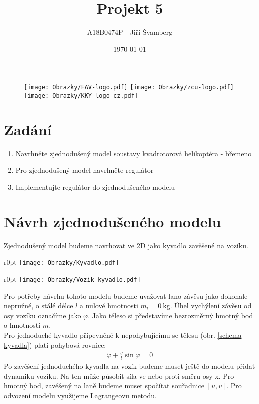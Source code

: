 \documentclass[a4paper, 12pt]{article}
\author{A18B0474P - Jiří Švamberg}
\title{Projekt 5}
\date{\today}
\begin{document}
	\begin{titlepage}
		\maketitle
		\begin{figure}
			\centering
			\texttt{[image: Obrazky/FAV-logo.pdf]}
			\texttt{[image: Obrazky/zcu-logo.pdf]}
			\texttt{[image: Obrazky/KKY\_logo\_cz.pdf]}
		\end{figure}
		\thispagestyle{empty}
		\newpage
	\end{titlepage}

	\tableofcontents
	\newpage
	\section{Zadání}
		\begin{enumerate}
			\item Navrhněte zjednodušený model soustavy kvadrotorová helikoptéra - břemeno\\
			\item Pro zjednodušený model navrhněte regulátor\\
			\item Implementujte regulátor do zjednodušeného modelu\\
		\end{enumerate}
		\clearpage
	\section{Návrh zjednodušeného modelu}
		Zjednodušený model budeme navrhovat ve 2D jako kyvadlo zavěšené na vozíku.
		\begin{wrapfigure}{r}{0pt}
			\texttt{[image: Obrazky/Kyvadlo.pdf]}
			\caption{Schéma jednoduchého kyvadla}
			\label{schema kyvadla}
		\end{wrapfigure}
		\begin{wrapfigure}{r}{0pt}
			\texttt{[image: Obrazky/Vozik-kyvadlo.pdf]}
			\caption{Schéma soustavy vozík-kyvadlo}
			\label{schema vozik-kyvadlo}
		\end{wrapfigure}
		Pro potřeby návrhu tohoto modelu budeme uvažovat lano závěsu jako dokonale nepružné, o stálé délce $l$ a nulové hmotnosti $m_l = \SI{0}{\kilogram}$. Úhel vychýlení závěsu od osy vozíku označíme jako $\varphi$. Jako těleso si představíme bezrozměrný hmotný bod o hmotnosti $m$.\\
		Pro jednoduché kyvadlo připevněné k nepohybujícímu se tělesu (obr. \ref{schema kyvadla}) platí pohybová rovnice:
		\begin{align*}
			\ddot{\varphi}+\frac{g}{l}\sin\varphi=0
		\end{align*}
		Po zavěšení jednoduchého kyvadla na vozík budeme muset ještě do modelu přidat dynamiku vozíku. Na ten může působit síla ve nebo proti směru osy x. Pro hmotný bod, zavěšený na laně budeme muset spočítat souřadnice $\left[u, v\right]$. Pro odvození modelu využijeme Lagrangeovu metodu.
\end{document}
